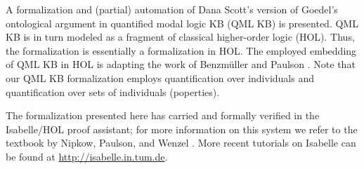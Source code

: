 %
\begin{isabellebody}%
\def\isabellecontext{GoedelGod}%
%
\isadelimtheory
%
\endisadelimtheory
%
\isatagtheory
%
\endisatagtheory
{\isafoldtheory}%
%
\isadelimtheory
%
\endisadelimtheory
%
\isamarkuptrue%
%
\begin{isamarkuptext}%
A formalization and (partial) automation of Dana Scott's version \cite{ScottNotes}
 of Goedel's ontological argument \cite{GoedelNotes} in quantified modal logic KB (QML KB) is presented. 
 QML KB is in turn modeled as a fragment of classical higher-order logic (HOL). 
 Thus, the formalization is essentially a formalization in HOL. The employed embedding 
 of QML KB in HOL is adapting the work of Benzm\"uller and Paulson \cite{J23,B9}.
 Note that our QML KB formalization employs quantification over individuals and 
 quantification over sets of individuals (poperties).

 The formalization presented here has carried and formally verified in the Isabelle/HOL 
 proof assistant; for more information on this system we refer to the textbook by Nipkow, 
 Paulson, and Wenzel \cite{Isabelle}. More recent tutorials on Isabelle can be found 
 at \url{http://isabelle.in.tum.de}.


\end{isamarkuptext}
\end{isabellebody}

